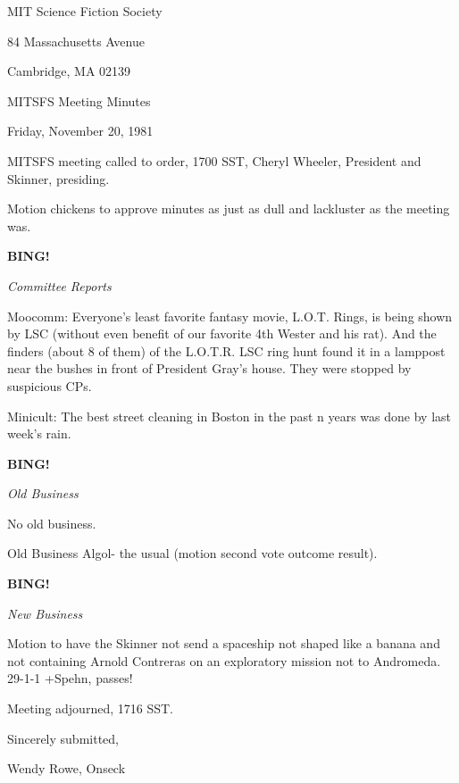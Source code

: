 \documentclass[12pt]{article}
\newcommand{\bing}{{\bf BING!} }
\newcommand{\goto}[1]{\bing \vskip 12pt \centerline{{\em{#1}}}}
\begin{document}
\begin{center}

MIT Science Fiction Society 

84 Massachusetts Avenue

Cambridge, MA 02139

\vspace{12pt}

MITSFS Meeting Minutes 

Friday, November 20, 1981

\end{center}
 
\vspace{18pt}

\setlength{\parskip}{6pt}

\noindent
MITSFS meeting called to order, 1700 SST,
Cheryl Wheeler, President and Skinner, presiding.

Motion chickens to approve minutes as just as dull and lackluster as the meeting was.

\goto{Committee Reports}

Moocomm: Everyone's least favorite fantasy movie, L.O.T. Rings, is being shown by LSC (without even benefit of our favorite 4th Wester and his rat). And the finders (about 8 of them) of the L.O.T.R. LSC ring hunt found it in a lamppost near the bushes in front of President Gray's house. They were stopped by suspicious CPs.

Minicult: The best street cleaning in Boston in the past n years was done by last week's rain.

\goto{Old Business}

No old business.

Old Business Algol- the usual (motion second vote outcome result).

\goto{New Business}

Motion to have the Skinner not send a spaceship not shaped like a banana and not containing Arnold Contreras on an exploratory mission not to Andromeda. 29-1-1 +Spehn, passes!

\vspace{12pt}

\noindent
Meeting adjourned, 1716 SST.

\vspace{18pt}

\centerline{Sincerely submitted,}
\centerline{Wendy Rowe, Onseck}
\end{document}
